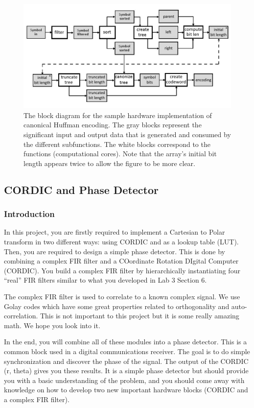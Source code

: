 \documentclass[a4paper,12pt,twoside]{article}
\begin{document}
\begin{figure}[H]
    \centering
    \includegraphics[width=\textwidth]{images/2.jpg}
    \caption{The block diagram for the sample hardware implementation of canonical Huffman encoding. The gray blocks represent the significant input and output data that is generated and consumed by the different subfunctions. The white blocks correspond to the functions (computational cores). Note that the array's initial bit length appears twice to allow the figure to be more clear.}
\end{figure}

\subsection{CORDIC and Phase Detector}
\subsubsection{Introduction}
In this project, you are firstly required to implement a Cartesian to Polar transform in two different ways: using CORDIC and as a lookup table (LUT). Then, you are required to design a simple phase detector. This is done by combining a complex FIR filter and a COordinate Rotation DIgital Computer (CORDIC). You build a complex FIR filter by hierarchically instantiating four “real” FIR filters similar to what you developed in Lab 3 Section 6.

The complex FIR filter is used to correlate to a known complex signal. We use Golay codes which have some great properties related to orthogonality and auto-correlation. This is not important to this project but it is some really amazing math. We hope you look into it.

In the end, you will combine all of these modules into a phase detector. This is a common block used in a digital communications receiver. The goal is to do simple synchronization and discover the phase of the signal. The output of the CORDIC (r, theta) gives you these results. It is a simple phase detector but should provide you with a basic understanding of the problem, and you should come away with knowledge on how to develop two new important hardware blocks (CORDIC and a complex FIR filter).
\end{document}
